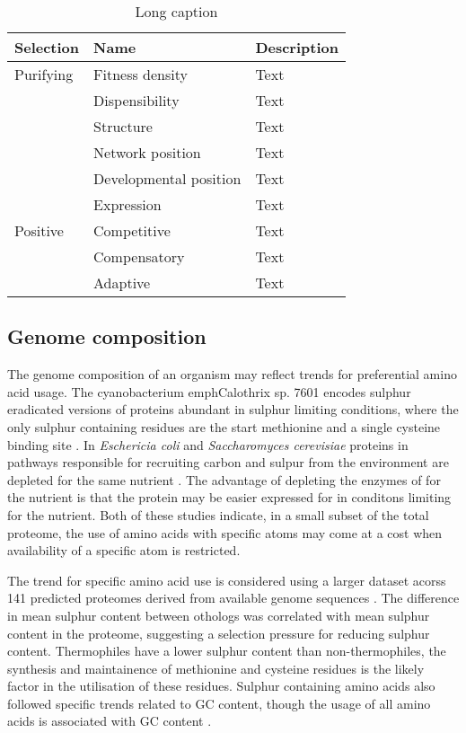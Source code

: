 \begin{table}
  \centering
  \begin{tabular}{ l l l }
  \toprule
  Selection & Name                   & Description \\ \midrule
  Purifying & Fitness density        & Text \\
            & Dispensibility         & Text \\
            & Structure              & Text \\
            & Network position       & Text \\
            & Developmental position & Text \\
            & Expression             & Text \\
  Positive  & Competitive            & Text \\
            & Compensatory           & Text \\
            & Adaptive               & Text \\ \bottomrule
  \end{tabular}
  \caption[Factors in protein evolution]{Long caption}
  \label{table:protein_selective_pressures}
\end{table}

\subsection{Genome composition}

The genome composition of an organism may reflect trends for preferential amino acid usage. The cyanobacterium emph{Calothrix} sp. 7601 encodes sulphur eradicated versions of proteins abundant in sulphur limiting conditions, where the only sulphur containing residues are the start methionine and a single cysteine binding site \cite{mazel1989}. In \emph{Eschericia coli} and \emph{Saccharomyces cerevisiae} proteins in pathways responsible for recruiting carbon and sulpur from the environment are depleted for the same nutrient \cite{baudoin2001}. The advantage of depleting the enzymes of for the nutrient is that the protein may be easier expressed for in conditons limiting for the nutrient. Both of these studies indicate, in a small subset of the total proteome, the use of amino acids with specific atoms may come at a cost when availability of a specific atom is restricted.

The trend for specific amino acid use is considered using a larger dataset acorss 141 predicted proteomes derived from available genome sequences \cite{bragg2006}. The difference in mean sulphur content between othologs was correlated with mean sulphur content in the proteome, suggesting a selection pressure for reducing sulphur content. Thermophiles have a lower sulphur content than non-thermophiles, the synthesis and maintainence of methionine and cysteine residues is the likely factor in the utilisation of these residues. Sulphur containing amino acids also followed specific trends related to GC content, though the usage of all amino acids is associated with GC content \cite{tekaia2006}.

